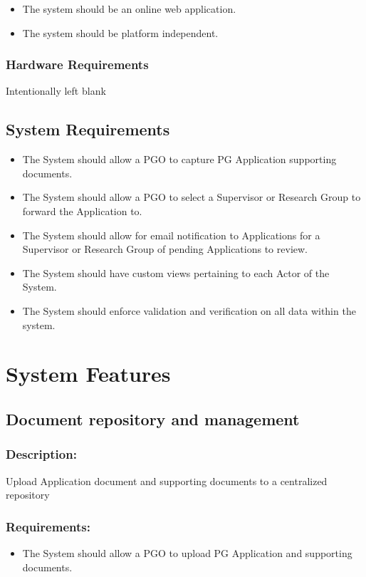 \documentclass[]{article}
\begin{document}
\begin{itemize}
	\item	The system should be an online web application.
	\item 	The system should be platform independent.
\end{itemize}
\subsubsection{Hardware Requirements}
Intentionally left blank

\subsection{System Requirements}
\begin{itemize}
\item	The System should allow a PGO to capture PG Application supporting documents.
\item   The System should allow a PGO to select a Supervisor or Research Group to forward the Application to. 
\item   The System should allow for email notification to Applications for a Supervisor or Research Group of pending Applications to review.
\item   The System should have custom views pertaining to each Actor of the System.
\item	The System should enforce validation and verification on all data within the system.
\end{itemize}

\section{System Features}

\subsection{Document repository and management}
\subsubsection{ Description: }Upload Application document and supporting documents to a centralized repository
\subsubsection{ Requirements:}
\begin{itemize}
\item  The System should allow a PGO to upload PG Application and supporting documents.
\end{itemize}
\end{document}
